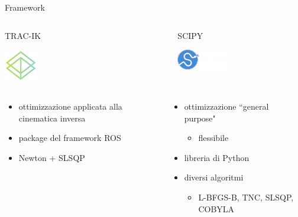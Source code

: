 
\begin{frame}{Framework}

\begin{columns}
\begin{column}{0.5\textwidth}
\begin{center} TRAC-IK\end{center}
\begin{center}
    \includegraphics[width=0.2\textwidth]{slide/img_cinematica_inversa/trac-ik.png}
\end{center}
\end{column}
\begin{column}{0.5\textwidth}
\begin{center} SCIPY\end{center}
\begin{center}
    \includegraphics[width=0.4\textwidth]{slide/img_cinematica_inversa/scipy.png}
\end{center}
\end{column}
\end{columns}

\begin{columns}
\begin{column}{0.5\textwidth}
\begin{itemize}
    \item<1-> ottimizzazione applicata alla cinematica inversa
    \item<4-> package del framework ROS
    \item<6-> Newton + SLSQP
\end{itemize}
\end{column}
\begin{column}{0.5\textwidth}
\begin{itemize}
    \item<2-> ottimizzazione ``general purpose"
    \begin{itemize}
        \item<3-> flessibile
    \end{itemize}
    \item<5-> libreria di Python
    \item<7-> diversi algoritmi
    \begin{itemize}
        \item<7-> L-BFGS-B, TNC, SLSQP, COBYLA
    \end{itemize}
\end{itemize}
\end{column}
\end{columns}


\end{frame}
